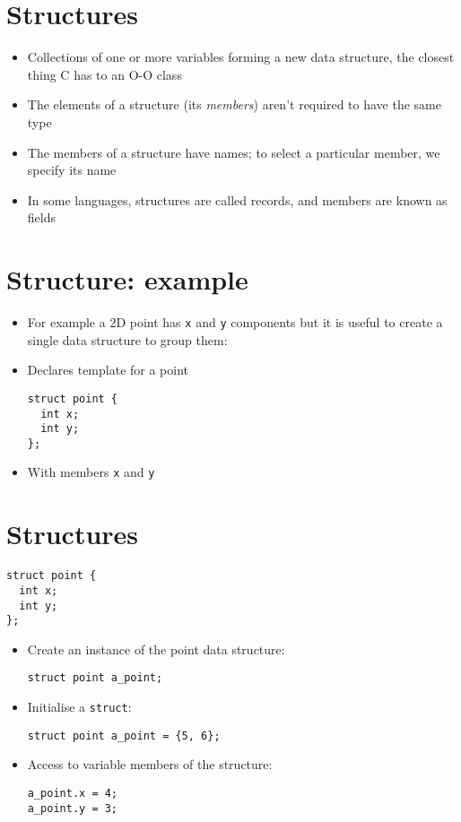\documentclass{article}
\begin{document}
\section{Structures}
\begin{itemize}
\item Collections of one or more variables forming a new data structure, the closest thing C has to an O-O class

\item The elements of a structure (its \emph{members}) aren't required to have the same type

\item The members of a structure have names; to select a particular member, we specify its name

\item In some languages, structures are called records, and members are known as fields
\end{itemize}



\section{Structure: example}
\begin{itemize}
\item For example a 2D point has \verb!x! and \verb!y! components but it is useful to create a single data structure to group them: 


\item Declares template for a point

\begin{verbatim}
struct point {
  int x;
  int y;
};
\end{verbatim}

\item With members \verb!x! and \verb!y!
\end{itemize}



\section{Structures}
\begin{verbatim}
struct point {
  int x;
  int y;
};
\end{verbatim}

\begin{itemize}
\item Create an instance of the point data structure:
\begin{verbatim}
struct point a_point;
\end{verbatim}

\item Initialise a \verb!struct!:
\begin{verbatim}
struct point a_point = {5, 6};
\end{verbatim}

\item Access to variable members of the structure:
\begin{verbatim}
a_point.x = 4;
a_point.y = 3;
\end{verbatim}
\end{itemize}
\end{document}
